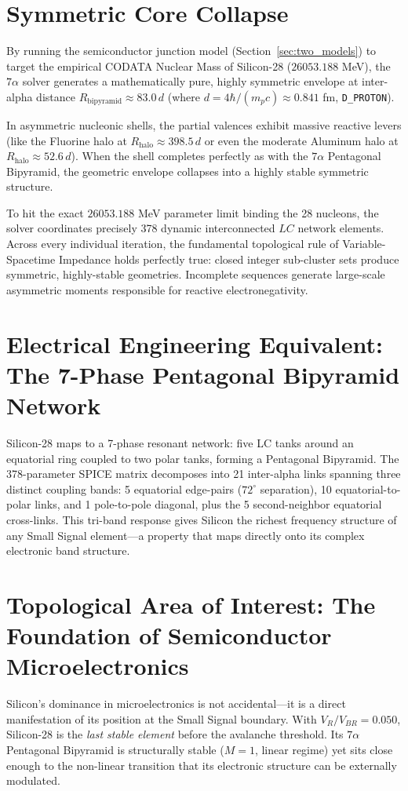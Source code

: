 \section{Symmetric Core Collapse}
By running the semiconductor junction model (Section~\ref{sec:two_models}) to target the empirical CODATA Nuclear Mass of Silicon-28 ($26053.188$ MeV), the $7\alpha$ solver generates a mathematically pure, highly symmetric envelope at inter-alpha distance $R_{\text{bipyramid}} \approx 83.0\,d$ (where $d = 4\hbar/(m_p c) \approx 0.841$ fm, \texttt{D\_PROTON}). 

In asymmetric nucleonic shells, the partial valences exhibit massive reactive levers (like the Fluorine halo at $R_{\text{halo}} \approx 398.5\,d$ or even the moderate Aluminum halo at $R_{\text{halo}} \approx 52.6\,d$). When the shell completes perfectly as with the $7\alpha$ Pentagonal Bipyramid, the geometric envelope collapses into a highly stable symmetric structure.

To hit the exact $26053.188$ MeV parameter limit binding the 28 nucleons, the solver coordinates precisely 378 dynamic interconnected $LC$ network elements. Across every individual iteration, the fundamental topological rule of Variable-Spacetime Impedance holds perfectly true: closed integer sub-cluster sets produce symmetric, highly-stable geometries. Incomplete sequences generate large-scale asymmetric moments responsible for reactive electronegativity.

\section{Electrical Engineering Equivalent: The 7-Phase Pentagonal Bipyramid Network}
Silicon-28 maps to a 7-phase resonant network: five LC tanks around an equatorial ring coupled to two polar tanks, forming a Pentagonal Bipyramid. The 378-parameter SPICE matrix decomposes into 21 inter-alpha links spanning three distinct coupling bands: 5 equatorial edge-pairs ($72^\circ$ separation), 10 equatorial-to-polar links, and 1 pole-to-pole diagonal, plus the 5 second-neighbor equatorial cross-links. This tri-band response gives Silicon the richest frequency structure of any Small Signal element---a property that maps directly onto its complex electronic band structure.

\section{Topological Area of Interest: The Foundation of Semiconductor Microelectronics}
Silicon's dominance in microelectronics is not accidental---it is a direct manifestation of its position at the Small Signal boundary. With $V_R/V_{BR} = 0.050$, Silicon-28 is the \textit{last stable element} before the avalanche threshold. Its $7\alpha$ Pentagonal Bipyramid is structurally stable ($M = 1$, linear regime) yet sits close enough to the non-linear transition that its electronic structure can be externally modulated.

